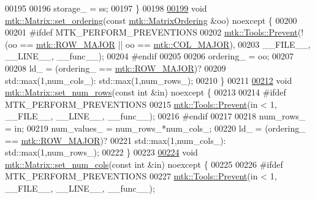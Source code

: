 \begin{DoxyCode}
00195 
00196   storage\_ = ss;
00197 \}
00198 
\hypertarget{mtk__matrix_8cc_source_l00199}{}\hyperlink{classmtk_1_1Matrix_a8bdaf3f8307b00a36843359f165e1f17}{00199} \textcolor{keywordtype}{void} \hyperlink{classmtk_1_1Matrix_a8bdaf3f8307b00a36843359f165e1f17}{mtk::Matrix::set\_ordering}(\textcolor{keyword}{const} 
      \hyperlink{group__c02-enums_ga622801bd9f912d0f976c3e383f5f581c}{mtk::MatrixOrdering} &oo) noexcept \{
00200 
00201 \textcolor{preprocessor}{  #ifdef MTK\_PERFORM\_PREVENTIONS}
00202   \hyperlink{classmtk_1_1Tools_a332324c6f25e66be9dff48c5987a3b9f}{mtk::Tools::Prevent}(!(oo == \hyperlink{namespacemtk_ga622801bd9f912d0f976c3e383f5f581cabc55178ac16eb1ce89b5f3ab915a91f3}{mtk::ROW\_MAJOR} || oo == 
      \hyperlink{namespacemtk_ga622801bd9f912d0f976c3e383f5f581ca7c11989c132253fb76b8f6b1314f7e13}{mtk::COL\_MAJOR}),
00203                       \_\_FILE\_\_, \_\_LINE\_\_, \_\_func\_\_);
00204 \textcolor{preprocessor}{  #endif}
00205 
00206   ordering\_ = oo;
00207 
00208   ld\_ = (ordering\_ == \hyperlink{namespacemtk_ga622801bd9f912d0f976c3e383f5f581cabc55178ac16eb1ce89b5f3ab915a91f3}{mtk::ROW\_MAJOR})?
00209     std::max(1,num\_cols\_): std::max(1,num\_rows\_);
00210 \}
00211 
\hypertarget{mtk__matrix_8cc_source_l00212}{}\hyperlink{classmtk_1_1Matrix_aa4aee0281421c22d9af273b7beb84306}{00212} \textcolor{keywordtype}{void} \hyperlink{classmtk_1_1Matrix_aa4aee0281421c22d9af273b7beb84306}{mtk::Matrix::set\_num\_rows}(\textcolor{keyword}{const} \textcolor{keywordtype}{int} &in) noexcept \{
00213 
00214 \textcolor{preprocessor}{  #ifdef MTK\_PERFORM\_PREVENTIONS}
00215   \hyperlink{classmtk_1_1Tools_a332324c6f25e66be9dff48c5987a3b9f}{mtk::Tools::Prevent}(in < 1, \_\_FILE\_\_, \_\_LINE\_\_, \_\_func\_\_);
00216 \textcolor{preprocessor}{  #endif}
00217 
00218   num\_rows\_ = in;
00219   num\_values\_ = num\_rows\_*num\_cols\_;
00220   ld\_ = (ordering\_ == \hyperlink{namespacemtk_ga622801bd9f912d0f976c3e383f5f581cabc55178ac16eb1ce89b5f3ab915a91f3}{mtk::ROW\_MAJOR})?
00221     std::max(1,num\_cols\_): std::max(1,num\_rows\_);
00222 \}
00223 
\hypertarget{mtk__matrix_8cc_source_l00224}{}\hyperlink{classmtk_1_1Matrix_aad6b4ced4a0447cc7bf2347fe86fd722}{00224} \textcolor{keywordtype}{void} \hyperlink{classmtk_1_1Matrix_aad6b4ced4a0447cc7bf2347fe86fd722}{mtk::Matrix::set\_num\_cols}(\textcolor{keyword}{const} \textcolor{keywordtype}{int} &in) noexcept \{
00225 
00226 \textcolor{preprocessor}{  #ifdef MTK\_PERFORM\_PREVENTIONS}
00227   \hyperlink{classmtk_1_1Tools_a332324c6f25e66be9dff48c5987a3b9f}{mtk::Tools::Prevent}(in < 1, \_\_FILE\_\_, \_\_LINE\_\_, \_\_func\_\_);

\end{DoxyCode}

